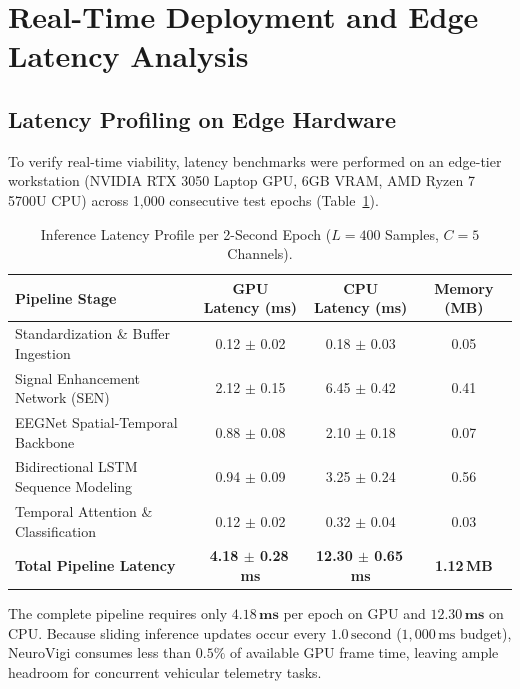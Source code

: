 \documentclass[conference]{IEEEtran}
\begin{document}
\section{Real-Time Deployment and Edge Latency Analysis}
\label{sec:deployment}

\subsection{Latency Profiling on Edge Hardware}
To verify real-time viability, latency benchmarks were performed on an edge-tier workstation (NVIDIA RTX 3050 Laptop GPU, 6GB VRAM, AMD Ryzen 7 5700U CPU) across 1,000 consecutive test epochs (Table~\ref{tab:latency_profile}).

\begin{table}[t]
\caption{Inference Latency Profile per 2-Second Epoch ($L=400$ Samples, $C=5$ Channels).}
\label{tab:latency_profile}
\centering
\footnotesize
\setlength{\tabcolsep}{5pt}
\begin{tabular}{@{}lccc@{}}
\toprule
\textbf{Pipeline Stage} & \textbf{GPU Latency (ms)} & \textbf{CPU Latency (ms)} & \textbf{Memory (MB)} \\
\midrule
Standardization \& Buffer Ingestion & 0.12 $\pm$ 0.02 & 0.18 $\pm$ 0.03 & 0.05 \\
Signal Enhancement Network (SEN) & 2.12 $\pm$ 0.15 & 6.45 $\pm$ 0.42 & 0.41 \\
EEGNet Spatial-Temporal Backbone & 0.88 $\pm$ 0.08 & 2.10 $\pm$ 0.18 & 0.07 \\
Bidirectional LSTM Sequence Modeling & 0.94 $\pm$ 0.09 & 3.25 $\pm$ 0.24 & 0.56 \\
Temporal Attention \& Classification & 0.12 $\pm$ 0.02 & 0.32 $\pm$ 0.04 & 0.03 \\
\midrule
\textbf{Total Pipeline Latency} & \textbf{4.18 $\pm$ 0.28\,ms} & \textbf{12.30 $\pm$ 0.65\,ms} & \textbf{1.12\,MB} \\
\bottomrule
\end{tabular}
\end{table}

The complete pipeline requires only $\mathbf{4.18\,\text{ms}}$ per epoch on GPU and $\mathbf{12.30\,\text{ms}}$ on CPU. Because sliding inference updates occur every $1.0\,\text{second}$ ($1,000\,\text{ms}$ budget), NeuroVigi consumes less than $0.5\%$ of available GPU frame time, leaving ample headroom for concurrent vehicular telemetry tasks.
\end{document}
